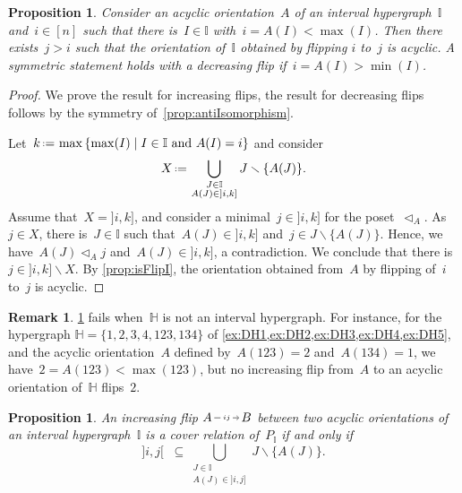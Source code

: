 \documentclass{amsart}
\newtheorem{proposition}[theorem]{Proposition}
\theoremstyle{definition}
\newtheorem{remark}[theorem]{Remark}
\newcommand{\set}[2]{\left\{ #1 \;\middle|\; #2 \right\}} %
\newcommand{\ssm}{\smallsetminus} %
\newcommand{\eqdef}{\mbox{\,\raisebox{0.2ex}{\scriptsize\ensuremath{\mathrm:}}\ensuremath{=}\,}} %
\newcommand{\less}{\vartriangleleft} %
\newcommand{\HH}{\mathbb H}  %
\newcommand{\II}{\mathbb I} %
\newcommand{\flip}[4]{\ensuremath{#1 \, \begin{tikzpicture}[scale=1,baseline=-.1cm] \path[->]  (0,0) edge node[fill=white,inner sep=2pt, font=\tiny ] {$#2#3$} (.7,0); \end{tikzpicture} \, #4}}
\begin{document}
\begin{proposition}
\label{prop:alwaysFlippableI}
Consider an acyclic orientation~$A$ of an interval hypergraph~$\II$ and~$i \in [n]$ such that there is~$I \in \II$ with~$i = A(I) < \max(I)$.
Then there exists~$j > i$ such that the orientation of~$\II$ obtained by flipping $i$ to~$j$ is acyclic.
A symmetric statement holds with a decreasing flip if~$i = A(I) > \min(I)$.
\end{proposition}

\begin{proof}
We prove the result for increasing flips, the result for decreasing flips follows by the symmetry of~\cref{prop:antiIsomorphism}.

Let~$k \eqdef \max\set{\max(I)}{I \in \II \text{ and } A(I) = i}$ and consider
\[
X \eqdef \bigcup_{\substack{J \in \II \\ A(J) \in {]i,k]}}} J \ssm \{A(J)\}.
\]
Assume that~$X = {]i,k]}$, and consider a minimal~$j \in {]i,k]}$ for the poset~$\less_A$.
As~$j \in X$, there is~$J \in \II$ such that~$A(J) \in {]i,k]}$ and~$j \in J \ssm \{A(J)\}$.
Hence, we have~$A(J) \less_A j$ and~$A(J) \in {]i,k]}$, a contradiction.
We conclude that there is~$j \in {]i,k]} \ssm X$.
By \cref{prop:isFlipI}, the orientation obtained from~$A$ by flipping of~$i$ to~$j$ is acyclic.
\end{proof}

\begin{remark}
\cref{prop:alwaysFlippableI} fails when~$\HH$ is not an interval hypergraph.
For instance, for the hypergraph $\HH=\{ 1, 2, 3, 4, 123, 134 \}$ of \cref{ex:DH1,ex:DH2,ex:DH3,ex:DH4,ex:DH5}, and the acyclic orientation~$A$ defined by~$A(123) = 2$ and~$A(134) = 1$, we have~$2 = A(123) < \max(123)$, but no increasing flip from~$A$ to an acyclic orientation of~$\HH$ flips~$2$.
\end{remark}

\begin{proposition}
\label{prop:isCoverI}
An increasing flip \flip{A}{i}{j}{B} between two acyclic orientations of an interval hypergraph~$\II$ is a cover relation of~$P_\II$ if and only if
\[
{]i,j[} \;\; \subseteq \bigcup_{\substack{J \in \II \\ A(J) \in {]i,j]}}} J \ssm \{A(J)\}.
\]
\end{proposition}
\end{document}
